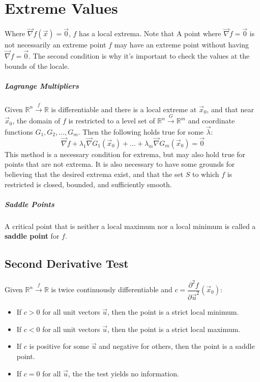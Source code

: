 \documentclass[11pt]{article}
\begin{document}
\section{Extreme Values}
	Where $\vec{\nabla} f(\vec{x}) = \vec{0}$, $f$ has a local extrema. Note that A point where $\vec{\nabla} f = \vec{0}$ is not necessarily an extreme point $f$ may have an extreme point without having $\vec{\nabla} f = \vec{0}$. The second condition is why it's important to check the values at the bounds of the locale.
	
	\subparagraph{Lagrange Multipliers} Given $\mathbb{R}^n \xrightarrow{f} \mathbb{R}$ is differentiable and there is a local extreme at $\vec{x}_0$, and that near $\vec{x}_0$, the domain of $f$ is restricted to a level set of $\mathbb{R}^n \xrightarrow{G} \mathbb{R}^m$ and coordinate functions $G_1, G_2, \ldots , G_m$. Then the following holds true for some $\vec{\lambda}$:
	\begin{equation}
		\vec{\nabla} f + \lambda_1 \vec{\nabla} G_1(\vec{x}_0) + \ldots + \lambda_m \vec{\nabla} G_m(\vec{x}_0) = \vec{0}
	\end{equation}
	This method is a necessary condition for extrema, but may also hold true for points that are not extrema. It is also necessary to have some grounds for believing that the desired extrema exist, and that the set $S$ to which $f$ is restricted is closed, bounded, and sufficiently smooth.
	
	\subparagraph{Saddle Points} A critical point that is neither a local maximum nor a local minimum is called a \textbf{saddle point} for $f$.
	
	\subsection{Second Derivative Test}
		Given $\mathbb{R}^n \xrightarrow{f} \mathbb{R}$ is twice continuously differentiable and $c = \dfrac{\partial^2 f}{\partial \vec{u}^2} (\vec{x}_0)$:
		\begin{itemize}
			\item If $c > 0$ for all unit vectors $\vec{u}$, then the point is a strict local minimum.
			\item If $c < 0$ for all unit vectors $\vec{u}$, then the point is a strict local maximum.
			\item If $c$ is positive for some $\vec{u}$ and negative for others, then the point is a saddle point.
			\item If $c = 0$ for all $\vec{u}$, the the test yields no information.
		\end{itemize}
		
\end{document}
